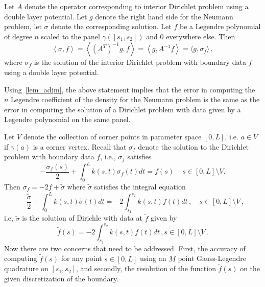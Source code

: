 \documentclass[12pt]{article}
\begin{document}
Let $A$ denote the operator corresponding to interior Dirichlet problem using a double layer potential. Let $g$ denote the
right hand side for the Neumann problem, let $\sigma$ denote the corresponding solution. Let $f$ be a Legendre polynomial of
degree $n$ scaled to the panel $\gamma([s_{1},s_{2}])$ and $0$ everywhere else. Then
\begin{equation}
\left<\sigma, f \right> = \left< (A^{T})^{-1} g, f\right> = \left< g, A^{-1} f \right> = \langle g, \sigma_{f}\rangle \, ,
\end{equation}
where $\sigma_{f}$ is the solution of the interior Dirichlet problem with boundary data $f$ using a double layer potential.
 

Using~\cref{lem_adjm}, the above statement implies that the error in computing the $n$ Legendre coefficient of
the density for the Neumann problem is the same as the error in computing the solution of a Dirichlet problem with 
data given by a Legendre polynomial on the same panel.  %

Let $V$ denote the collection of corner points in parameter space $[0,L]$, i.e. $a \in V$ if $\gamma(a)$ is a corner vertex.
Recall that $\sigma_{f}$ denote the solution to the Dirichlet problem with boundary data $f$, i.e., 
$\sigma_{f}$ satisfies
\begin{equation}
-\frac{\sigma_{f}(s)}{2}   + \int_{0}^{L} k(s,t) \sigma_{f}(t) dt  = f(s) \,  \quad s\in[0,L]\setminus{V}.
\end{equation}
 Then $\sigma_{f} = -2f + \tilde{\sigma}$ where $\tilde{\sigma}$ satisfies the integral equation
 \begin{equation}
-\frac{\tilde{\sigma}}{2}+ \int_{0}^{L} k(s,t) \tilde{\sigma}(t) dt = -2\int_{s_{1}}^{s_{2}} k(s,t) f(t) dt \, , \quad s\in[0,L] \setminus V \, ,
 \end{equation}
i.e, $\tilde{\sigma}$ is the solution of Dirichle with data at $\tilde{f}$ given by
\begin{equation}
\tilde{f}(s) = -2\int_{s_{1}}^{s_{2}} k(s,t) f(t) dt \, , s \in [0,L] \setminus V \, .
\end{equation}
Now there are two concerns that need to be addressed. First, the accuracy of computing $\tilde{f}(s)$ 
for any point $s \in [0,L]$ using an $M$ point Gauss-Legendre quadrature on $[s_{1},s_{2}]$, and secondly, 
the resolution of the function $\tilde{f}(s)$ on the given discretization of the boundary. 
\end{document}
